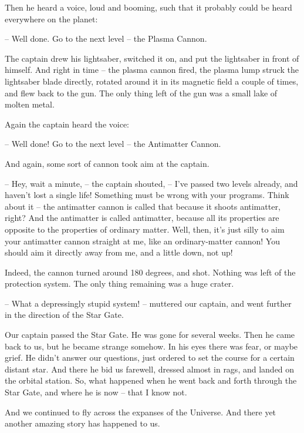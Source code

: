 \documentclass[ebook,twoside,final,openright]{memoir}
\begin{document}
\par
Then he heard a voice, loud and booming, such that it probably could be heard everywhere on the planet:\par
– Well done. Go to the next level – the Plasma Cannon.\par
The captain drew his lightsaber, switched it on, and put the lightsaber in front of himself. And right in time – the plasma cannon fired, the plasma lump struck the lightsaber blade directly, rotated around it in its magnetic field a couple of times, and flew back to the gun. The only thing left of the gun was a small lake of molten metal.\par
\par
Again the captain heard the voice:\par
– Well done! Go to the next level – the Antimatter Cannon.\par
And again, some sort of cannon took aim at the captain.\par
– Hey, wait a minute, – the captain shouted, – I’ve passed two levels already, and haven’t lost a single life! Something must be wrong with your programs. Think about it – the antimatter cannon is called that because it shoots antimatter, right? And the antimatter is called antimatter, because all its properties are opposite to the properties of ordinary matter. Well, then, it’s just silly to aim your antimatter cannon straight at me, like an ordinary-matter cannon! You should aim it directly away from me, and a little down, not up!\par
\par
Indeed, the cannon turned around 180 degrees, and shot. Nothing was left of the protection system. The only thing remaining was a huge crater.\par
– What a depressingly stupid system! – muttered our captain, and went further in the direction of the Star Gate.\par
\par
Our captain passed the Star Gate. He was gone for several weeks. Then he came back to us, but he became strange somehow. In his eyes there was fear, or maybe grief. He didn’t answer our questions, just ordered to set the course for a certain distant star. And there he bid us farewell, dressed almost in rags, and landed on the orbital station. So, what happened when he went back and forth through the Star Gate, and where he is now – that I know not. \par
\par
 And we continued to fly across the expanses of the Universe. And there yet another amazing story has happened to us.
\end{document}
